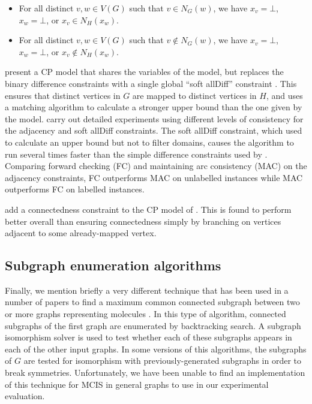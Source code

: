\begin{itemize}
    \item For all distinct $v, w \in V(G)$ such that $v \in N_G(w)$, we have 
$x_v=\bot$,
$x_w=\bot$, or
$x_v \in N_H(x_w)$.
\item For all distinct $v, w \in V(G)$ such that $v \not\in N_G(w)$, we have 
$x_v=\bot$,
$x_w=\bot$, or
$x_v \not\in N_H(x_w)$.
\end{itemize}

\citet{DBLP:conf/cp/NdiayeS11} present a CP model that shares the variables
of the \citeauthor{DBLP:conf/mco/VismaraV08} model, but replaces the binary difference
constraints with a single global ``soft allDiff''
constraint \citep{DBLP:conf/cp/PetitRB01}.  This ensures that distinct vertices
in $G$ are mapped to distinct vertices in $H$, and uses a matching algorithm
to calculate a stronger upper bound than the one given by
the \citeauthor{DBLP:conf/mco/VismaraV08} model.
\citeauthor{DBLP:conf/cp/NdiayeS11} carry out detailed experiments using
different levels of consistency for the adjacency and soft allDiff constraints.
The soft allDiff constraint, which used to calculate an upper bound but
not to filter domains, causes the algorithm to run several times faster
than the simple difference constraints used by \citeauthor{DBLP:conf/mco/VismaraV08}.
Comparing forward checking (FC) and maintaining arc consistency (MAC)
on the adjacency constraints, FC outperforms MAC on unlabelled instances
while MAC outperforms FC on labelled instances.

\cite{DBLP:conf/cp/McCreeshNPS16} add a connectedness constraint to the CP
model of \citet{DBLP:conf/cp/NdiayeS11}.  This is found to perform better
overall than ensuring connectedness simply by branching on vertices adjacent to
some already-mapped vertex.

\subsection{Subgraph enumeration algorithms}

Finally, we mention briefly a very different technique that has been used
in a number of papers to find a maximum common connected subgraph between two or more
graphs representing molecules
\citep{armitage1967automatic,takahashi1987recognition,DBLP:journals/jcheminf/DalkeH13}.
In this type of algorithm, connected
subgraphs of the first graph are enumerated by backtracking search.
A subgraph isomorphism solver is used to test whether each of these subgraphs
appears in each of the other input graphs.  In some versions of this algorithms,
the subgraphs of $G$ are tested for isomorphism with previously-generated subgraphs
in order to break symmetries.
Unfortunately, we have been unable to find an implementation of this technique
for MCIS in general graphs to use in our experimental evaluation.

